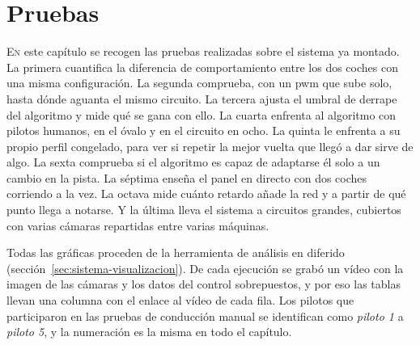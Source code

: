 \chapter{Pruebas}
\label{cap:pruebas}

\newcommand{\video}[2][ver]{\href{https://youtu.be/\detokenize{#2}}{#1}}

\lettrine{E}{n} este capítulo se recogen las pruebas realizadas sobre el sistema ya montado. La primera cuantifica la diferencia de comportamiento entre los dos coches con una misma configuración. La segunda comprueba, con un \gls{pwm} que sube solo, hasta dónde aguanta el mismo circuito.
La tercera ajusta el umbral de derrape del algoritmo y mide qué se gana con ello. La cuarta enfrenta al algoritmo con pilotos humanos, en el óvalo y en el circuito en ocho. La quinta le enfrenta a su propio perfil congelado, para ver si repetir la mejor vuelta que llegó a dar sirve de algo. La sexta comprueba si el algoritmo es capaz de adaptarse él solo a un cambio en la pista. La séptima enseña el panel en directo con dos coches corriendo a la vez. La octava mide cuánto retardo añade la red y a partir de qué punto llega a notarse. Y la última lleva el sistema a circuitos grandes, cubiertos con varias cámaras repartidas entre varias máquinas.

Todas las gráficas %
proceden de la herramienta de análisis en diferido (sección~\ref{sec:sistema-visualizacion}).  
De cada ejecución se grabó un vídeo con la imagen de las cámaras y los datos del control sobrepuestos, y por eso las tablas llevan una columna con el enlace al vídeo de cada fila. 
Los pilotos que participaron en las pruebas de conducción manual se identifican como \emph{piloto 1} a \emph{piloto 5}, y la numeración es la misma en todo el capítulo. %


